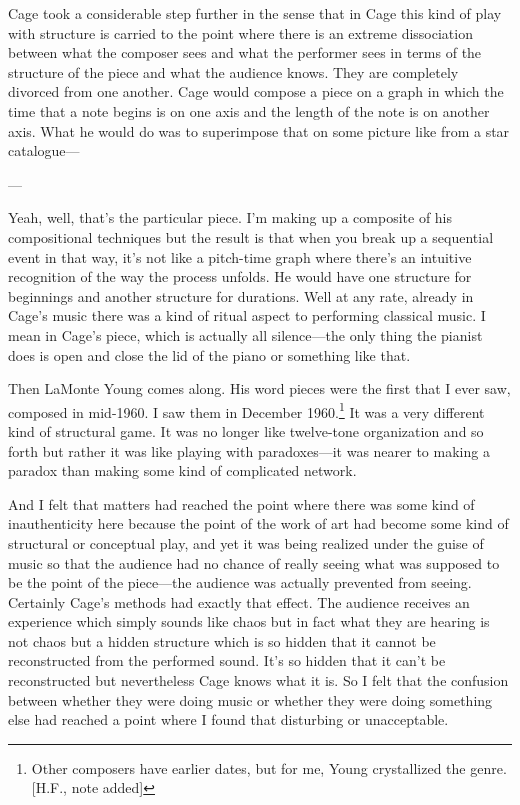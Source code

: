 Cage took a considerable step further in the sense that in Cage this 
kind of play with structure is carried to the point where there is an 
extreme dissociation between what the composer sees and what the 
performer sees in terms of the structure of the piece and what the 
audience knows. They are completely divorced from one another. Cage 
would compose a piece on a graph in which the time that a note begins 
is on one axis and the length of the note is on another axis. What he 
would do was to superimpose that on some picture like from a star 
catalogue--- 


 --- 


 Yeah, well, that's the particular piece. I'm making up a 
composite of his compositional techniques but the result is that when you 
break up a sequential event in that way, it's not like a pitch-time graph 
where there's an intuitive recognition of the way the process unfolds. 
He would have one structure for beginnings and another structure for 
durations. Well at any rate, already in Cage's music there was a kind of 
ritual aspect to performing classical music. I mean in Cage's piece, 
which is actually all silence---the only thing the pianist does is open and 
close the lid of the piano or something like that. 

Then LaMonte Young comes along. His word pieces were the first 
that I ever saw, composed in mid-1960. I saw them in December 
1960.\footnote{Other composers have earlier dates, but for me, 
Young crystallized the genre. [H.F., note added]}
It was a very different kind of structural game. It was no longer like 
twelve-tone organization and so forth but rather it was like playing 
with paradoxes---it was nearer to making a paradox than making some 
kind of complicated network. 

And I felt that matters had reached the point where there was 
some kind of inauthenticity here because the point of the work of art 
had become some kind of structural or conceptual play, and yet it was 
being realized under the guise of music so that the audience had no 
chance of really seeing what was supposed to be the point of the 
piece---the audience was actually prevented from seeing. Certainly 
Cage's methods had exactly that effect. The audience receives an 
experience which simply sounds like chaos but in fact what they are 
hearing is not chaos but a hidden structure which is so hidden that it 
cannot be reconstructed from the performed sound. It's so hidden that 
it can't be reconstructed but nevertheless Cage knows what it is. So I 
felt that the confusion between whether they were doing music or 
whether they were doing something else had reached a point where I 
found that disturbing or unacceptable. 

